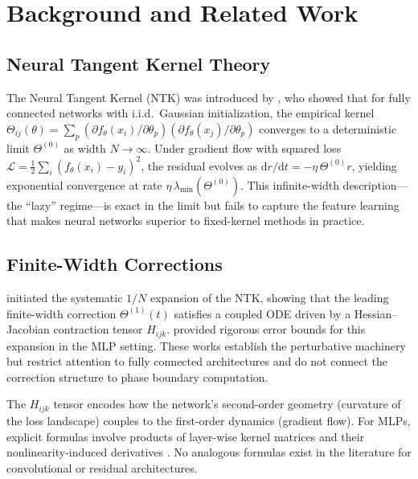 \documentclass[11pt]{article}
\theoremstyle{definition}
\newcommand{\cL}{\mathcal{L}}
\newcommand{\dd}{\mathrm{d}}
\newcommand{\pp}{\partial}
\renewcommand{\Theta}{\varTheta}
\begin{document}
\section{Background and Related Work}
\label{sec:background}

\subsection{Neural Tangent Kernel Theory}

The Neural Tangent Kernel (NTK) was introduced by \citet{jacot2018neural}, who showed that for fully connected networks with i.i.d.\ Gaussian initialization, the empirical kernel $\Theta_{ij}(\theta) = \sum_p (\pp f_\theta(x_i)/\pp \theta_p)(\pp f_\theta(x_j)/\pp \theta_p)$ converges to a deterministic limit $\Theta^{(0)}$ as width $N \to \infty$. Under gradient flow with squared loss $\cL = \frac{1}{2}\sum_i (f_\theta(x_i) - y_i)^2$, the residual evolves as $\dd r/\dd t = -\eta\,\Theta^{(0)} r$, yielding exponential convergence at rate $\eta\,\lambda_{\min}(\Theta^{(0)})$. This infinite-width description---the ``lazy'' regime---is exact in the limit but fails to capture the feature learning that makes neural networks superior to fixed-kernel methods in practice.

\subsection{Finite-Width Corrections}

\citet{dyer2020asymptotics} initiated the systematic $1/N$ expansion of the NTK, showing that the leading finite-width correction $\Theta^{(1)}(t)$ satisfies a coupled ODE driven by a Hessian--Jacobian contraction tensor $H_{ijk}$. \citet{huang2020dynamics} provided rigorous error bounds for this expansion in the MLP setting. These works establish the perturbative machinery but restrict attention to fully connected architectures and do not connect the correction structure to phase boundary computation.

The $H_{ijk}$ tensor encodes how the network's second-order geometry (curvature of the loss landscape) couples to the first-order dynamics (gradient flow). For MLPs, explicit formulas involve products of layer-wise kernel matrices and their nonlinearity-induced derivatives \citep{dyer2020asymptotics}. No analogous formulas exist in the literature for convolutional or residual architectures.
\end{document}
